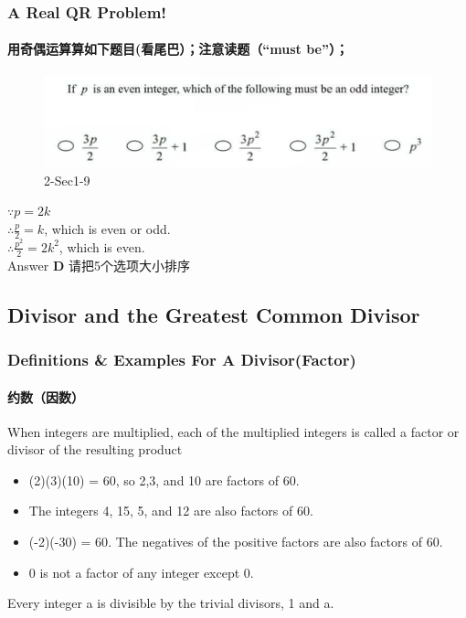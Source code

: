\documentclass[
	11pt, %
]{beamer}
\begin{document}
\begin{frame}
	\frametitle{A Real QR Problem!}
	\framesubtitle{用奇偶运算算如下题目(看尾巴）；注意读题（“must be”）；}
	\begin{figure}
		\includegraphics[width=\linewidth]{Even_Odd_Example_Question2.png}
		\caption{2-Sec1-9}
	\end{figure}
	\pause
	$\because p=2k$ \\ 
$\therefore \frac{p}{2}= k$, which is even or odd. \\
$\therefore \frac{p^2}{2}= 2k^2$, which is even. \\
\pause
\bigskip
Answer \textbf{D} 请把5个选项大小排序
\end{frame}


\subsection{Divisor and the Greatest Common Divisor}

\begin{frame}
	\frametitle{Definitions \& Examples For A Divisor(Factor)}
	\framesubtitle{约数（因数）}
	\begin{definition}
		When integers are multiplied, each of the multiplied integers is called a
\alert{factor or divisor} of the resulting product
	\end{definition}
	
	\smallskip %
	
	\begin{example}
		\begin{itemize}
			\item (2)(3)(10) = 60, so 2,3, and 10 are factors of 60. 
			\item The integers 4, 15, 5, and 12 are also factors of 60. 
			\item \alert{(-2)(-30) = 60}. The negatives of the positive factors are also factors of 60.
			\item 0 is \alert{not} a factor of any integer except \alert{0}.
		\end{itemize}
	\end{example}
	
	\begin{corollary}
		Every integer a is divisible by the trivial divisors, 1 and a. 
	\end{corollary}
\end{frame}
\end{document}
